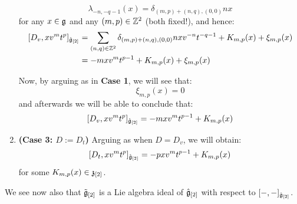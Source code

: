 \begin{remark}
\begin{enumerate}
                    $$\lambda_{-n, -q - 1}(x) = \delta_{(m, p) + (n, q), (0, 0)} n x$$
                for any $x \in \mathfrak{g}$ and any $(m, p) \in \mathbb{Z}^2$ (both fixed!), and hence:
                    $$
                        \begin{aligned}
                            [D_v, x v^m t^p]_{\hat{\g}_{[2]}} & = \sum_{(n, q) \in \Z^2} \delta_{(m, p) + (n, q), (0, 0)} n x v^{-n} t^{-q - 1} + K_{m, p}(x) + \xi_{m, p}(x)
                            \\
                            & = -m x v^m t^{p - 1} + K_{m, p}(x) + \xi_{m, p}(x)
                        \end{aligned}
                    $$

                Now, by arguing as in \textbf{Case 1}, we will see that:
                    $$\xi_{m, p}(x) = 0$$
                and afterwards we will be able to conclude that:
                    $$[D_v, x v^m t^p]_{\hat{\mathfrak{g}}_{[2]}} = -m x v^m t^{p - 1} + K_{m, p}(x)$$
                \item \textbf{(Case 3: $D := D_t$)} Arguing as when $D = D_v$, we will obtain:
                    $$[D_t, x v^m t^p]_{\hat{\mathfrak{g}}_{[2]}} = -p x v^m t^{p - 1} + K_{m, p}(x)$$
                for some $K_{m, p}(x) \in \mathfrak{z}_{[2]}$.
            \end{enumerate}
        \end{remark}
        \begin{remark}
            We see now also that $\tilde{\mathfrak{g}}_{[2]}$ is a Lie algebra ideal of $\hat{\mathfrak{g}}_{[2]}$ with respect to $[-, -]_{\hat{\mathfrak{g}}_{[2]}}$.
        \end{remark}

